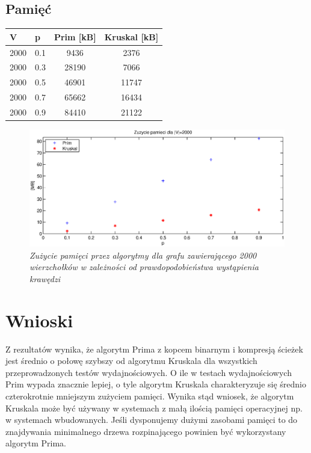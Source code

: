 \documentclass[a4paper, 10pt]{article}
\begin{document}
\hfill

\hfill

\hfill
\FloatBarrier




\subsection{Pamięć}


\begin{center}
    \begin{tabular}{| l | l | c | c |}
    \hline
    V & p & Prim [kB] & Kruskal [kB] \\ \hline
	2000 & 0.1 & 9436 & 2376  \\ 
	2000 & 0.3 & 28190& 7066  \\ 
	2000 & 0.5 & 46901& 11747  \\ 
	2000 & 0.7 & 65662& 16434  \\ 
	2000 & 0.9 & 84410& 21122  \\ \hline
    \end{tabular}
\end{center}




\begin{figure}[ht!]
\centering
\includegraphics[width=165mm]{wykresy/mem.eps}
\caption{\it{Zużycie pamięci przez algorytmy dla grafu zawierającego 2000 wierzchołków w zależności od prawdopodobieństwa wystąpienia krawędzi}}
\label{overflow}
\end{figure}
\FloatBarrier
\section{Wnioski}

Z rezultatów wynika, że algorytm Prima z kopcem binarnym i kompresją ścieżek jest średnio o połowę szybszy od algorytmu Kruskala dla wszystkich przeprowadzonych testów wydajnościowych.
O ile w testach wydajnościowych Prim wypada znacznie lepiej, o tyle algorytm Kruskala charakteryzuje się średnio czterokrotnie mniejszym zużyciem pamięci. Wynika stąd wniosek, że algorytm 
Kruskala może być używany w systemach z małą ilością pamięci operacyjnej np. w systemach wbudowanych. Jeśli dysponujemy dużymi zasobami pamięci to do znajdywania minimalnego drzewa rozpinającego
powinien być wykorzystany algorytm Prima.







	
\FloatBarrier




\nocite{*}
\renewcommand\refname{\section{Bibliografia}}

\end{document}
